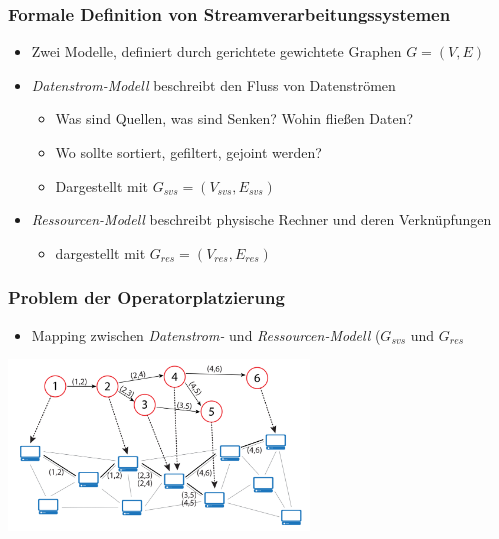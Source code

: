 \documentclass{beamer}
\begin{document}
\begin{frame}
\frametitle{Formale Definition von Streamverarbeitungssystemen}
\begin{itemize}
    \item Zwei Modelle, definiert durch gerichtete gewichtete Graphen $G= (V,E)$
    \item \textit{Datenstrom-Modell} beschreibt den Fluss von Datenströmen
    \begin{itemize}
        \item Was sind Quellen, was sind Senken? Wohin fließen Daten?
        \item Wo sollte sortiert, gefiltert, gejoint werden?
        \item Dargestellt mit $G_{svs} = (V_{svs}, E_{svs})$
    \end{itemize}
    \item \textit{Ressourcen-Modell} beschreibt physische Rechner und deren Verknüpfungen
    \begin{itemize}
        \item dargestellt mit $G_{res} = (V_{res}, E_{res})$
    \end{itemize}
\end{itemize}
\end{frame}

\begin{frame}
\frametitle{Problem der Operatorplatzierung}
\begin{itemize}
    \item Mapping zwischen \textit{Datenstrom- } und \textit{Ressourcen-Modell} ($G_{svs}$ und $G_{res}$
\end{itemize}
\begin{center}
    \includegraphics[width=0.6\textwidth]{res/OPP-graph.png}
\end{center}
\end{frame}
\end{document}
